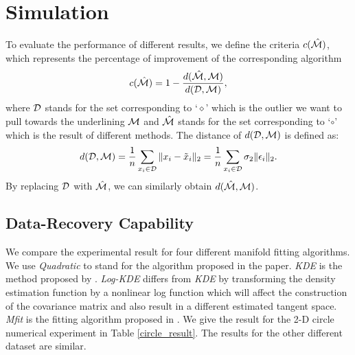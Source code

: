 \documentclass{article}
\theoremstyle{remark}
\begin{document}
%
%
\vspace{-4mm}
\section{Simulation}
To evaluate the performance of different results, we define the criteria $c({\hat{\cal M}})$,  which represents the percentage of improvement of the corresponding algorithm
\[
c({\hat{\cal M}}) = 1-\frac{d(\hat{\cal M}, {\cal M})}{d({\cal D}, {\cal M})},
\] 
where $\cal D$ stands for the set corresponding to `$\diamond$' which is the outlier we want to pull towards the underlining $\cal M$ and $\hat{\cal M}$ stands for the set corresponding to `$\circ$' which is the result of different methods. The distance of $d({\cal D}, {\cal M})$ is defined as:
\[
d({\cal D}, {\cal M}) = \frac{1}{n} \sum_{x_i\in {\cal D}} \|x_i-\tilde{x}_i\|_2 = \frac{1}{n} \sum_{x_i\in \cal D} \sigma_2\|\epsilon_i\|_2.
\] 
By replacing $\cal D$ with $\hat{\cal M}$, we can similarly obtain $d(\hat{\cal M}, {\cal M})$.
\subsection{Data-Recovery Capability}
We compare the experimental result for four different manifold fitting algorithms. We use {\it Quadratic} to stand for the algorithm proposed in the paper. {\it KDE} is the method proposed by \cite{genovese2014nonparametric}. {\it Log-KDE} differs from {\it KDE} by transforming the density estimation function by a nonlinear log function which will affect the construction of the covariance matrix and also result in a different estimated tangent space. {\it Mfit} is the fitting algorithm proposed in \cite{fefferman2018fitting}. We give the result for the 2-D circle numerical experiment in Table \ref{circle_result}. The results for the other different dataset are similar.
\end{document}
